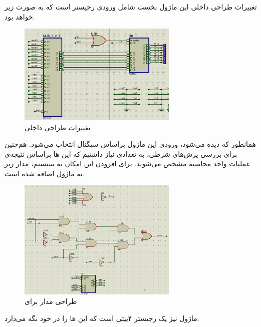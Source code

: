 \documentclass[12pt,onecolumn,a4paper,fleqn]{article}
\begin{document}
تغییرات طراحی داخلی این ماژول نخست شامل ورودی رجیستر 
است که به صورت زیر خواهد بود.
\begin{figure}[H]
	\centering
	\includegraphics[width=0.68\textwidth]{source/alu1_inner.png}
	\caption{تغییرات طراحی داخلی }
	\label{fig:alu1-inner}
\end{figure}
همانطور که دیده می‌شود، ورودی این ماژول براساس سیگنال  انتخاب می‌شود. هم‌چنین برای بررسی پرش‌های شرطی، به تعدادی  نیاز داشتیم که این ها براساس نتیجه‌ی عملیات واحد محاسبه مشخص می‌شوند. برای افزودن این امکان به سیستم، مدار زیر به ماژول اضافه شده است.
\begin{figure}[H]
	\centering
	\includegraphics[width=0.68\textwidth]{source/sr.png}
	\caption{طراحی مدار برای }
	\label{fig:sr-inner}
\end{figure}
ماژول  نیز یک رجیستر ۴بیتی است که این ها را در خود نگه می‌دارد.
\end{document}
